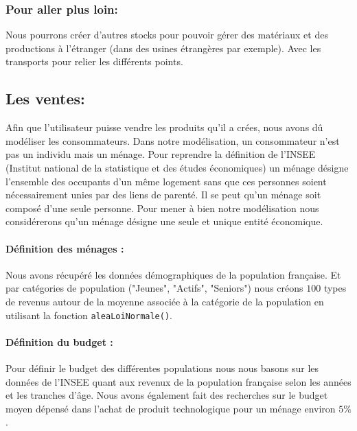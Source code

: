 \subsubsection{Pour aller plus loin:} 

Nous pourrons créer d’autres stocks pour pouvoir gérer des matériaux et des productions à l’étranger (dans des usines étrangères par exemple). Avec les transports pour relier les différents points.


\subsection{Les ventes:}
	
Afin que l'utilisateur puisse vendre les produits qu'il a crées, nous avons dû modéliser les consommateurs. Dans notre modélisation, un consommateur n'est pas un individu mais un ménage. Pour reprendre la définition de l'INSEE (Institut national de la statistique et des études économiques) un ménage désigne l'ensemble des occupants d'un même logement sans que ces personnes soient nécessairement unies par des liens de parenté. Il se peut qu'un ménage soit composé d'une seule personne. Pour mener à bien notre modélisation nous considérerons qu'un ménage désigne une seule et unique entité économique.
	
\paragraph{Définition des ménages :} Nous avons récupéré les données démographiques de la population française. Et par catégories de population ("Jeunes", "Actifs", "Seniors") nous créons $100$ types de revenus autour de la moyenne associée à la catégorie de la population en utilisant la fonction \texttt{aleaLoiNormale()}. 
	
\paragraph{Définition du budget :} Pour définir le budget des différentes populations nous nous basons sur les données de l'INSEE quant aux revenux de la population française selon les années et les tranches d'âge. Nous avons également fait des recherches sur le budget moyen dépensé dans l'achat de produit technologique pour un ménage environ $5\%$. 
	
